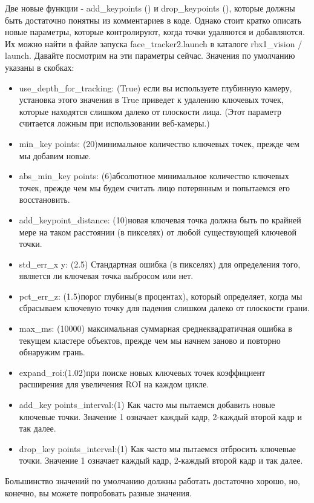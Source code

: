 Две новые функции - add\_keypoints () и drop\_keypoints (), которые должны быть достаточно понятны из комментариев в коде. Однако стоит кратко описать новые параметры, которые контролируют, когда точки удаляются и добавляются. Их можно найти в файле запуска face\_tracker2.launch в каталоге rbx1\_vision / launch. Давайте посмотрим на эти параметры сейчас. Значения по умолчанию указаны в скобках:

\begin{itemize} 
\item { use\_depth\_for\_tracking: (True) если вы используете глубинную камеру, установка этого значения в True приведет к удалению ключевых точек, которые находятся слишком далеко от плоскости лица. (Этот параметр считается ложным при использовании веб-камеры.)} 
\item { min\_key points: (20)минимальное количество ключевых точек, прежде чем мы добавим новые.} 
\item { abs\_min\_key points: (6)абсолютное минимальное количество ключевых точек, прежде чем мы будем считать лицо потерянным и попытаемся его восстановить.} 
\item { add\_keypoint\_distance: (10)новая ключевая точка должна быть по крайней мере на таком расстоянии (в пикселях) от любой существующей ключевой точки.} 
\item { std\_err\_x y: (2.5) Стандартная ошибка (в пикселях) для определения того, является ли ключевая точка выбросом или нет.} 
\item { pct\_err\_z: (1.5)порог глубины(в процентах), который определяет, когда мы сбрасываем ключевую точку для падения слишком далеко от плоскости грани.} 
\item { max\_ms: (10000) максимальная суммарная среднеквадратичная ошибка в текущем кластере объектов, прежде чем мы начнем заново и повторно обнаружим грань.} 
\item { expand\_roi:(1.02)при поиске новых ключевых точек коэффициент расширения для увеличения ROI на каждом цикле.} 
\item { add\_key points\_interval:(1) Как часто мы пытаемся добавить новые ключевые точки. Значение 1 означает каждый кадр, 2-каждый второй кадр и так далее.} 
\item { drop\_key points\_interval:(1) Как часто мы пытаемся отбросить ключевые точки. Значение 1 означает каждый кадр, 2-каждый второй кадр и так далее.} 
\end{itemize} 

Большинство значений по умолчанию должны работать достаточно хорошо, но, конечно, вы можете попробовать разные значения.

